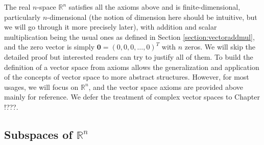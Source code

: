 The real $n$-space $\mathbb{R}^n$ satisfies all the axioms above and is finite-dimensional, particularly $n$-dimensional (the notion of dimension here should be intuitive, but we will go through it more precisely later), with addition and scalar multiplication being the usual ones as defined in Section \ref{section:vectoraddmul}, and the zero vector is simply $\textbf{0} = (0,0,0,\ldots,0)^T$ with $n$ zeros. We will skip the detailed proof but interested readers can try to justify all of them. To build the definition of a vector space from axioms allows the generalization and application of the concepts of vector space to more abstract structures. However, for most usages, we will focus on $\mathbb{R}^n$, and the vector space axioms are provided above mainly for reference. We defer the treatment of complex vector spaces to Chapter !???.

\subsection{Subspaces of $\mathbb{R}^n$}


